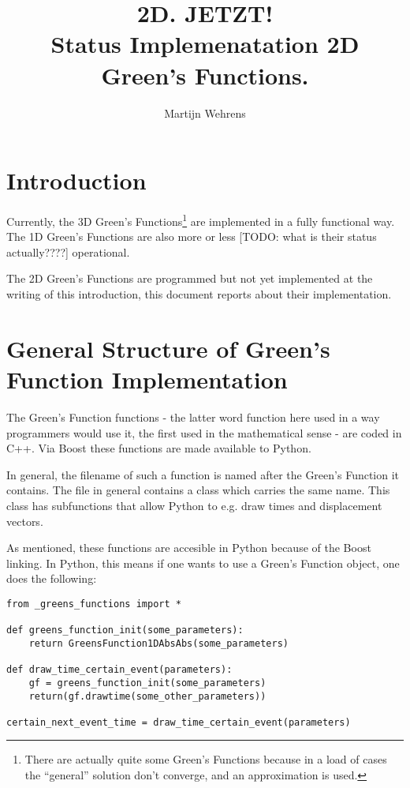 \documentclass[a4paper,10pt]{article}
\title{2D. JETZT! \\ Status Implemenatation 2D Green's Functions.}
\author{Martijn Wehrens}
\begin{document}
\maketitle

\section{Introduction}

Currently, the 3D Green's Functions\footnote{There are actually quite some Green's Functions because in a load of cases the ``general'' solution don't converge, and an approximation is used.} are implemented in a fully functional way. The 1D Green's Functions are also more or less [TODO: what is their status actually????] operational.

The 2D Green's Functions are programmed but not yet implemented at the writing of this introduction, this document reports about their implementation. 

\section{General Structure of Green's Function Implementation}

The Green's Function functions - the latter word function here used in a way programmers would use it, the first used in the mathematical sense - are coded in C++. Via Boost these functions are made available to Python.

In general, the filename of such a function is named after the Green's Function it contains. The file in general contains a class which carries the same name. This class has subfunctions that allow Python to e.g. draw times and displacement vectors. 

As mentioned, these functions are accesible in Python because of the Boost linking. In Python, this means if one wants to use a Green's Function object, one does the following:

\label{GFusageexample}
\begin{verbatim}
from _greens_functions import *

def greens_function_init(some_parameters):
    return GreensFunction1DAbsAbs(some_parameters)

def draw_time_certain_event(parameters):
    gf = greens_function_init(some_parameters)
    return(gf.drawtime(some_other_parameters))

certain_next_event_time = draw_time_certain_event(parameters)

\end{verbatim}
\end{document}
